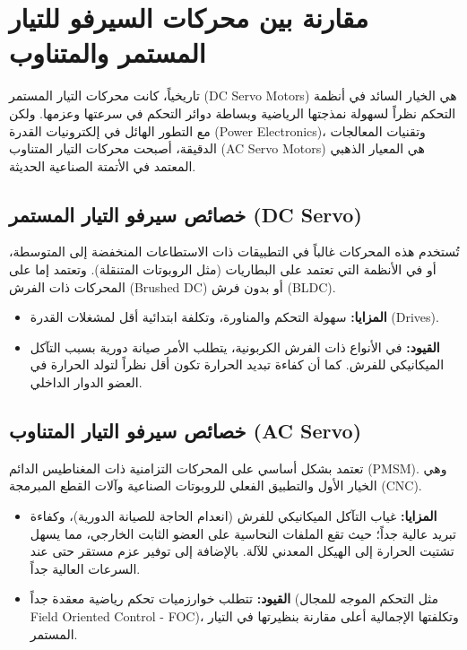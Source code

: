 \section{مقارنة بين محركات السيرفو للتيار المستمر والمتناوب}
\label{sec:ac_dc_comparison}

تاريخياً، كانت محركات التيار المستمر (\textenglish{DC Servo Motors}) هي الخيار السائد في أنظمة التحكم نظراً لسهولة نمذجتها الرياضية وبساطة دوائر التحكم في سرعتها وعزمها. ولكن مع التطور الهائل في إلكترونيات القدرة (\textenglish{Power Electronics})، وتقنيات المعالجات الدقيقة، أصبحت محركات التيار المتناوب (\textenglish{AC Servo Motors}) هي المعيار الذهبي المعتمد في الأتمتة الصناعية الحديثة.

\subsection{خصائص سيرفو التيار المستمر (\textenglish{DC Servo})}
تُستخدم هذه المحركات غالباً في التطبيقات ذات الاستطاعات المنخفضة إلى المتوسطة، أو في الأنظمة التي تعتمد على البطاريات (مثل الروبوتات المتنقلة). وتعتمد إما على المحركات ذات الفرش (\textenglish{Brushed DC}) أو بدون فرش (\textenglish{BLDC}).
\begin{itemize}
    \item \textbf{المزايا:} سهولة التحكم والمناورة، وتكلفة ابتدائية أقل لمشغلات القدرة (\textenglish{Drives}).
    \item \textbf{القيود:} في الأنواع ذات الفرش الكربونية، يتطلب الأمر صيانة دورية بسبب التآكل الميكانيكي للفرش. كما أن كفاءة تبديد الحرارة تكون أقل نظراً لتولد الحرارة في العضو الدوار الداخلي.
\end{itemize}

\subsection{خصائص سيرفو التيار المتناوب (\textenglish{AC Servo})}
تعتمد بشكل أساسي على المحركات التزامنية ذات المغناطيس الدائم (\textenglish{PMSM}). وهي الخيار الأول والتطبيق الفعلي للروبوتات الصناعية وآلات القطع المبرمجة (\textenglish{CNC}).
\begin{itemize}
    \item \textbf{المزايا:} غياب التآكل الميكانيكي للفرش (انعدام الحاجة للصيانة الدورية)، وكفاءة تبريد عالية جداً؛ حيث تقع الملفات النحاسية على العضو الثابت الخارجي، مما يسهل تشتيت الحرارة إلى الهيكل المعدني للآلة. بالإضافة إلى توفير عزم مستقر حتى عند السرعات العالية جداً.
    \item \textbf{القيود:} تتطلب خوارزميات تحكم رياضية معقدة جداً (مثل التحكم الموجه للمجال \textenglish{Field Oriented Control - FOC})، وتكلفتها الإجمالية أعلى مقارنة بنظيرتها في التيار المستمر.
\end{itemize}

